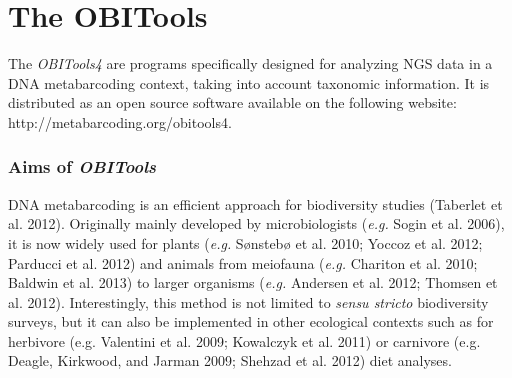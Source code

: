 \documentclass[
  letterpaper,
  DIV=11,
  numbers=noendperiod]{scrreprt}
\begin{document}
\part{The OBITools}

The \emph{OBITools4} are programs specifically designed for analyzing
NGS data in a DNA metabarcoding context, taking into account taxonomic
information. It is distributed as an open source software available on
the following website: http://metabarcoding.org/obitools4.

\hypertarget{aims-of-obitools}{%
\section*{\texorpdfstring{Aims of
\emph{OBITools}}{Aims of OBITools}}\label{aims-of-obitools}}


DNA metabarcoding is an efficient approach for biodiversity studies
(Taberlet et al. 2012). Originally mainly developed by microbiologists
(\emph{e.g.} Sogin et al. 2006), it is now widely used for plants
(\emph{e.g.} Sønstebø et al. 2010; Yoccoz et al. 2012; Parducci et al.
2012) and animals from meiofauna (\emph{e.g.} Chariton et al. 2010;
Baldwin et al. 2013) to larger organisms (\emph{e.g.} Andersen et al.
2012; Thomsen et al. 2012). Interestingly, this method is not limited to
\emph{sensu stricto} biodiversity surveys, but it can also be
implemented in other ecological contexts such as for herbivore (e.g.
Valentini et al. 2009; Kowalczyk et al. 2011) or carnivore (e.g. Deagle,
Kirkwood, and Jarman 2009; Shehzad et al. 2012) diet analyses.
\end{document}
